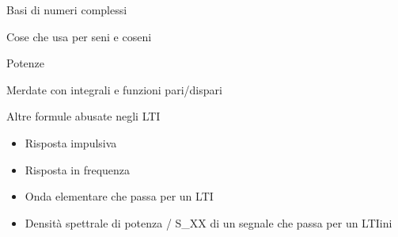 \documentclass{article}
\begin{document}
Basi di numeri complessi

Cose che usa per seni e coseni

Potenze
\begin{itemize}
\end{itemize}


Merdate con integrali e funzioni pari/dispari

\begin{itemize}
\end{itemize}

Altre formule abusate negli LTI
\begin{itemize}
\item Risposta impulsiva
\item Risposta in frequenza
\item Onda elementare che passa per un LTI
\item Densità spettrale di potenza / S_{XX} di un segnale che passa per un LTIini
\end{itemize}

  
\end{document}
